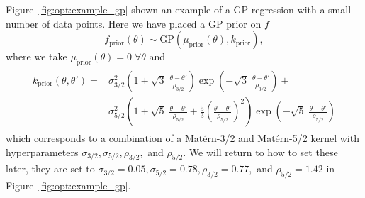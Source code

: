 Figure~\ref{fig:opt:example_gp} shown an example of a GP regression with a small
number of data points.  Here we have placed a GP prior on $f$
\[
f_{\mathrm{prior}} (\theta) \sim \mathrm{GP}\left(\mu_{\text{prior}} (\theta),k_{\text{prior}}\right),
\]
where we take
$\mu_{\text{prior}} (\theta) = 0 \; \forall \theta$ and
\begin{align}
\label{eq:opt:kprior}
\begin{split}
k_{\text{prior}}\left(\theta,\theta'\right) = & \sigma_{3/2}^2 \left(1+\sqrt{3} \; \frac{\theta-\theta'}{\rho_{3/2}}\right)\exp\left(-\sqrt{3} \;\frac{\theta-\theta'}{\rho_{3/2}}\right) +\\&\sigma_{5/2}^2 \left(1+\sqrt{5}\;\frac{\theta-\theta'}{\rho_{5/2}}+\frac{5}{3}\left(\frac{\theta-\theta'}{\rho_{5/2}}\right)^2\right)\exp\left(-\sqrt{5}\;\frac{\theta-\theta'}{\rho_{5/2}}\right)
\end{split}
\end{align}
which corresponds to a combination of a Mat\'{e}rn-3/2 and Mat\'{e}rn-5/2
kernel with hyperparameters $\sigma_{3/2}, \sigma_{5/2}, \rho_{3/2},$ and
$\rho_{5/2}$.  We will return to how to set these later, they are set to
$\sigma_{3/2}=0.05, \sigma_{5/2}=0.78, \rho_{3/2}=0.77,$ and
$\rho_{5/2}=1.42$ in Figure~\ref{fig:opt:example_gp}.

